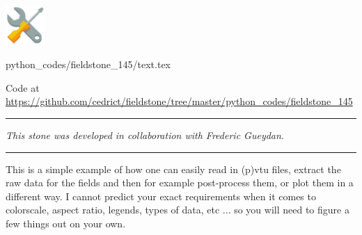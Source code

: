 \includegraphics[height=1.5cm]{images/pictograms/tools}


\begin{flushright} {\tiny {\color{gray} python\_codes/fieldstone\_145/text.tex}} \end{flushright}



\begin{center}

Code at \url{https://github.com/cedrict/fieldstone/tree/master/python_codes/fieldstone_145}
\end{center}

\par\noindent\rule{\textwidth}{0.4pt}

{\sl This stone was developed in collaboration with Frederic Gueydan}. 

\par\noindent\rule{\textwidth}{0.4pt}

This \stone is a simple example of how one can easily read in (p)vtu files, extract the raw data for the fields and 
then for example post-process them, or plot them in a different way.
I cannot predict your exact requirements when it comes to colorscale, aspect ratio, legends, types of data, etc ...
so you will need to figure a few things out on your own. 
